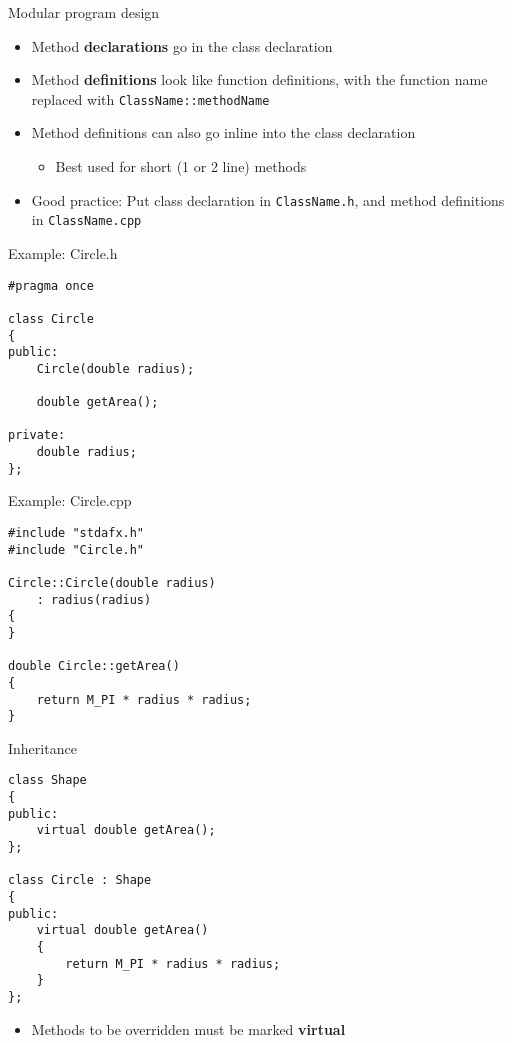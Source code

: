 \begin{frame}[fragile]{Modular program design}
    \begin{itemize}
        \item Method \textbf{declarations} go in the class declaration \pause
        \item Method \textbf{definitions} look like function definitions,
            with the function name replaced with \lstinline{ClassName::methodName} \pause
        \item Method definitions can also go inline into the class declaration
        \begin{itemize}
            \item Best used for short (1 or 2 line) methods
        \end{itemize}
        \pause
        \item Good practice: Put class declaration in \texttt{ClassName.h}, and method definitions in \texttt{ClassName.cpp}
    \end{itemize}
\end{frame}

\begin{frame}[fragile]{Example: Circle.h}
    \begin{lstlisting}
#pragma once

class Circle
{
public:
    Circle(double radius);
    
    double getArea();

private:
    double radius;
};
    \end{lstlisting}
\end{frame}

\begin{frame}[fragile]{Example: Circle.cpp}
    \begin{lstlisting}
#include "stdafx.h"
#include "Circle.h"

Circle::Circle(double radius)
    : radius(radius)
{
}

double Circle::getArea()
{
    return M_PI * radius * radius;
}
    \end{lstlisting}
\end{frame}

\begin{frame}[fragile]{Inheritance}
    \begin{lstlisting}
class Shape
{
public:
    virtual double getArea();
};

class Circle : Shape
{
public:
    virtual double getArea()
    {
        return M_PI * radius * radius;
    }
};
    \end{lstlisting}
    \pause
    \begin{itemize}
        \item Methods to be overridden must be marked \textbf{virtual}
    \end{itemize}
\end{frame}

